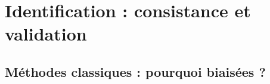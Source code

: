 \section{Identification : consistance et validation}

\subsection*{Méthodes classiques : pourquoi biaisées ?}
